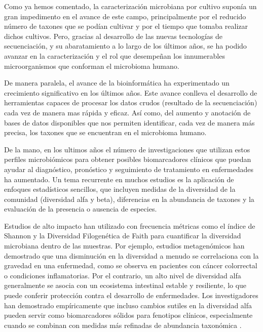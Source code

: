 Como ya hemos comentado, la caracterización microbiana por cultivo suponía un gran impedimento en el avance de este campo, principalmente por el reducido número de taxones que se podían cultivar y por el tiempo que tomaba realizar dichos cultivos. Pero, gracias al desarrollo de las nuevas tecnologías de secuenciación, y su abaratamiento a lo largo de los últimos años, se ha podido avanzar en la caracterización y el rol que desempeñan los innumerables microorganismos que conforman el microbioma humano.

De manera paralela, el avance de la bioinformática ha experimentado un crecimiento significativo en los últimos años. Este avance conlleva el desarrollo de herramientas capaces de procesar los datos crudos (resultado de la secuenciación) cada vez de manera mas rápida y eficaz. Así como, del aumento y anotación de bases de datos disponibles que nos permiten identificar, cada vez de manera más precisa, los taxones que se encuentran en el microbioma humano.

De la mano, en los ultimos años el número de investigaciones que utilizan estos perfiles microbiómicos para obtener posibles biomarcadores clínicos que puedan ayudar al diagnóstico, pronóstico y seguimiento de tratamiento en enfermedades ha aumentado. Un tema recurrente en muchos estudios es la aplicación de enfoques estadísticos sencillos, que incluyen medidas de la diversidad de la comunidad (diversidad alfa y beta), diferencias en la abundancia de taxones y la evaluación de la presencia o ausencia de especies.  


Estudios de alto impacto han utilizado con frecuencia métricas como el índice de Shannon y la Diversidad Filogenética de Faith para cuantificar la diversidad microbiana dentro de las muestras. Por ejemplo, estudios metagenómicos han demostrado que una disminución en la diversidad a menudo se correlaciona con la gravedad en una enfermedad, como se observa en pacientes con cáncer colorrectal o condiciones inflamatorias. Por el contrario, un alto nivel de diversidad alfa generalmente se asocia con un ecosistema intestinal estable y resiliente, lo que puede conferir protección contra el desarrollo de enfermedades. Los investigadores han demostrado empíricamente que incluso cambios sutiles en la diversidad alfa pueden servir como biomarcadores sólidos para fenotipos clínicos, especialmente cuando se combinan con medidas más refinadas de abundancia taxonómica \cite{yu2017metagenomic}.

